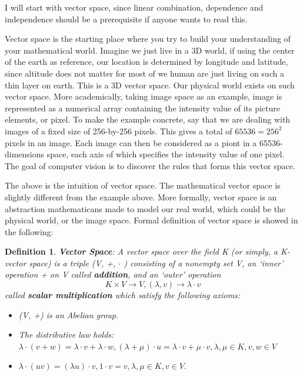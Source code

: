 \documentclass[a4paper]{book}
\newtheorem{definition}{Definition}[section]
\begin{document}
  I will start with vector space, since linear combination, dependence and
  independence should be a prerequisite if anyone wants to read this.

  Vector space is the starting place where you try to build your
  understanding of your mathematical world. Imagine we just live in
  a 3D world, if using the center of the earth as reference, our
  location is determined by longitude and latitude, since altitude
  does not matter for most of we human are just living on such a
  thin layer on earth. This is a 3D vector space. Our physical world
  exists on such vector space. More academically, taking image space as
  an example, image is represented as a numerical array containing the
  intensity value of its picture elements, or pixel. To make the example
  concrete, say that we are dealing with images of a fixed size of
  256-by-256 pixels. This gives a total of $ 65536 = 256^2 $ pixels in
  an image. Each image can then be considered as a piont in a
  65536-dimensions space, each axis of which specifies the intensity
  value of one pixel\cite{Hyvrinen09}.  The goal of computer vision is
  to discover the rules that forms this vector space.

  The above is the intuition of vector space. The mathematical vector
  space is slightly different from the example above. More formally,
  vector space is an abstraction mathematicans made to model our real
  world, which could be the physical world, or the image space. Formal
  definition of vector space is showed in the following\cite{amann2006analysis}:

  \begin{definition}
    \textbf{Vector Space}: A vector space over the field K (or simply, a
    K-vector space) is a triple (V, +, $\cdot$ ) consisting of a nonempty set
    V, an `inner' operation + on V called \textbf{addition}, and an `outer'
    operation
    \begin{equation*}
      K \times V \rightarrow V, (\lambda, v) \rightarrow \lambda \cdot v
    \end{equation*}
    called \textbf{scalar multiplication} which satisfy the following
    axioms:
    \begin{itemize}
      \item (V, +) is an Abelian group.
      \item The distributive law holds:\\
        $\lambda \cdot (v + w) = \lambda \cdot v + \lambda \cdot w,
        (\lambda + \mu) \cdot u = \lambda \cdot v + \mu \cdot v, \lambda,
        \mu \in K, v, w \in V$
      \item $\lambda \cdot (uv) = (\lambda u) \cdot v, 1 \cdot v = v,
        \lambda, \mu \in K, v \in V.$
    \end{itemize}
  \end{definition}
\end{document}
